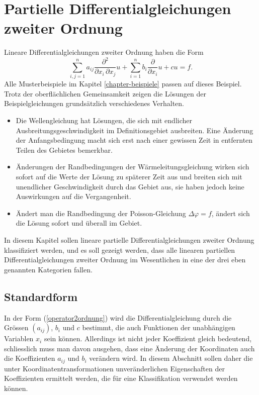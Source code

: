 %
%
%
\chapter{Partielle Differentialgleichungen zweiter Ordnung\label{chapter-2ordnung}}
Lineare Differentialgleichungen zweiter Ordnung haben die Form
\begin{equation}
\sum_{i,j=1}^na_{ij}\frac{\partial^2}{\partial x_i\,\partial x_j} u
+
\sum_{i=1}^nb_i\frac{\partial}{\partial x_i} u+cu=f.
\label{operator2ordnung}
\end{equation}
Alle Musterbeispiele im Kapitel \ref{chapter-beispiele} passen auf dieses 
Beispiel.
Trotz der oberflächlichen Gemeinsamkeit zeigen die Lösungen
der Beispielgleichungen grundsätzlich verschiedenes Verhalten.
\begin{itemize}
\item Die Wellengleichung hat Lösungen, die sich mit endlicher
Ausbreitungsgeschwindigkeit im Definitionsgebiet ausbreiten. Eine Änderung
der Anfangsbedingung macht sich erst nach einer gewissen Zeit in
entfernten Teilen des Gebietes bemerkbar.
\item Änderungen der Randbedingungen der Wärmeleitungsgleichung wirken
sich sofort auf die Werte der Lösung zu späterer Zeit aus und breiten
sich mit unendlicher Geschwindigkeit durch das Gebiet aus, sie haben jedoch
keine Auswirkungen auf die Vergangenheit.
\item Ändert man die Randbedingung der Poisson-Gleichung $\Delta \varphi=f$,
ändert sich die Lösung sofort und überall im Gebiet.
\end{itemize}
In diesem Kapitel sollen lineare partielle Differentialgleichungen zweiter
Ordnung klassifiziert werden, und es soll gezeigt werden, dass alle
linearen partiellen Differentialgleichungen zweiter Ordnung im Wesentlichen
in eine der drei eben genannten Kategorien fallen.

\section{Standardform}
In der Form (\ref{operator2ordnung}) wird die Differentialgleichung durch
die Grössen $(a_{ij})$, $b_i$ und $c$ bestimmt, die auch Funktionen
der unabhängigen Variablen $x_i$ sein können.
Allerdings ist nicht jeder Koeffizient gleich bedeutend, schliesslich muss
man davon ausgehen, dass eine Änderung der Koordinaten auch die Koeffizienten
$a_{ij}$ und $b_i$ verändern wird.
In diesem Abschnitt sollen daher die unter Koordinatentransformationen
unveränderlichen Eigenschaften der Koeffizienten ermittelt werden,
die für eine Klassifikation verwendet werden können.

